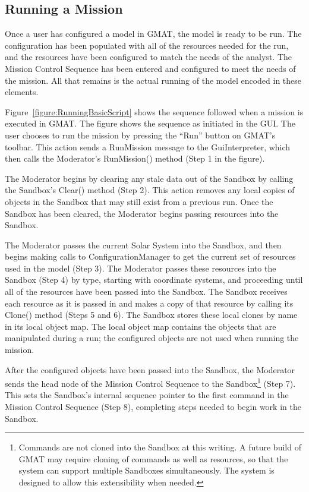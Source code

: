 \subsection{\label{section:SandboxMCSExecution}Running a Mission}

Once a user has configured a model in GMAT, the model is ready to be run.  The configuration has
been populated with all of the resources needed for the run, and the resources have been configured
to match the needs of the analyst.  The Mission Control Sequence has been entered and configured to
meet the needs of the mission.  All that remains is the actual running of the model encoded in these
elements.

Figure~\ref{figure:RunningBasicScript} shows the sequence followed when a mission is executed in
GMAT.  The figure shows the sequence as initiated in the GUI.  The user chooses to run the mission
by pressing the ``Run'' button on GMAT's toolbar.  This action sends a RunMission message to the
GuiInterpreter, which then calls the Moderator's RunMission() method (Step 1 in the figure).

The Moderator begins by clearing any stale data out of the Sandbox by calling the Sandbox's Clear()
method (Step 2).  This action removes any local copies of objects in the Sandbox that may still
exist from a previous run.  Once the Sandbox has been cleared, the Moderator begins passing
resources into the Sandbox.

The Moderator passes the current Solar System into the Sandbox, and then begins making calls to
ConfigurationManager to get the current set of resources used in the model (Step 3).  The Moderator
passes these resources into the Sandbox (Step 4) by type, starting with coordinate systems, and
proceeding until all of the resources have been passed into the Sandbox.  The Sandbox receives each
resource as it is passed in and makes a copy of that resource by calling its Clone() method (Steps 5
and 6).  The Sandbox stores these local clones by name in its local object map.  The local object
map contains the objects that are manipulated during a run; the configured objects are not used when
running the mission.

After the configured objects have been passed into the Sandbox, the Moderator sends the head node of
the Mission Control Sequence to the Sandbox\footnote{Commands are not cloned into the Sandbox at
this writing.  A future build of GMAT may require cloning of commands as well as resources, so that
the system can support multiple Sandboxes simultaneously.  The system is designed to allow this
extensibility when needed.} (Step 7).  This sets the Sandbox's internal sequence pointer to the
first command in the Mission Control Sequence (Step 8), completing steps needed to begin work in the
Sandbox.

